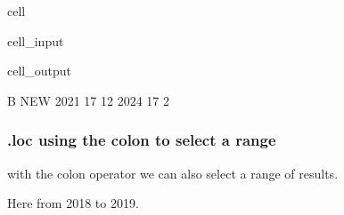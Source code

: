 \documentclass[letterpaper,10pt,english]{jupyterBook}
\begin{document}
\begin{sphinxuseclass}{cell}\begin{sphinxVerbatimInput}

\begin{sphinxuseclass}{cell_input}
\begin{sphinxVerbatim}[commandchars=\\\{\}]
\PYG{p}{[}\PYG{p}{[}\PYG{p}{]}\PYG{p}{[}\PYG{p}{]}\PYG{p}{]}
\end{sphinxVerbatim}

\end{sphinxuseclass}\end{sphinxVerbatimInput}
\begin{sphinxVerbatimOutput}

\begin{sphinxuseclass}{cell_output}
\begin{sphinxVerbatim}[commandchars=\\\{\}]
       B  NEW
2021  17   12
2024  17    2
\end{sphinxVerbatim}

\end{sphinxuseclass}\end{sphinxVerbatimOutput}

\end{sphinxuseclass}

\subsubsection{.loc using the colon to select a range}
\label{\detokenize{content/04_PythonEssentials/PythonPandasDataframes:loc-using-the-colon-to-select-a-range}}
\sphinxAtStartPar
with the colon operator we can also select a range of results.

\sphinxAtStartPar
Here from 2018 to 2019.
\end{document}
